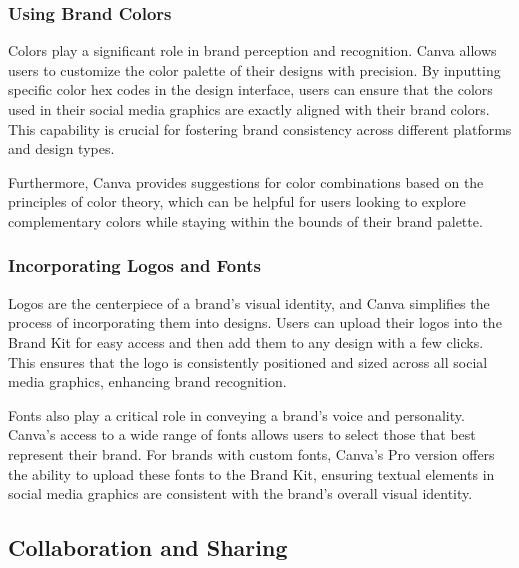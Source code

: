 \documentclass[
]{book}
\begin{document}
\hypertarget{using-brand-colors}{%
\subsubsection*{Using Brand Colors}\label{using-brand-colors}}

Colors play a significant role in brand perception and recognition. Canva allows users to customize the color palette of their designs with precision. By inputting specific color hex codes in the design interface, users can ensure that the colors used in their social media graphics are exactly aligned with their brand colors. This capability is crucial for fostering brand consistency across different platforms and design types.

Furthermore, Canva provides suggestions for color combinations based on the principles of color theory, which can be helpful for users looking to explore complementary colors while staying within the bounds of their brand palette.

\hypertarget{incorporating-logos-and-fonts}{%
\subsubsection*{Incorporating Logos and Fonts}\label{incorporating-logos-and-fonts}}

Logos are the centerpiece of a brand's visual identity, and Canva simplifies the process of incorporating them into designs. Users can upload their logos into the Brand Kit for easy access and then add them to any design with a few clicks. This ensures that the logo is consistently positioned and sized across all social media graphics, enhancing brand recognition.

Fonts also play a critical role in conveying a brand's voice and personality. Canva's access to a wide range of fonts allows users to select those that best represent their brand. For brands with custom fonts, Canva's Pro version offers the ability to upload these fonts to the Brand Kit, ensuring textual elements in social media graphics are consistent with the brand's overall visual identity.

\hypertarget{collaboration-and-sharing}{%
\subsection*{Collaboration and Sharing}\label{collaboration-and-sharing}}
\end{document}
